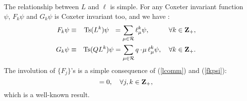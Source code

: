 \documentclass[a4paper,12pt]{article}
\begin{document}
The relationship between $L$ and $\ell$ is simple.
For any Coxeter invariant function $\psi$, $F_k\psi$
and $G_k\psi$ is Coxeter invariant too, and
we have \cite{kps}:
\begin{eqnarray}
 F_k\psi&\equiv& \mbox{Ts}(L^k)\psi\ \
=\sum_{\mu\in{\mathcal R}} \ell_\mu^k\psi,
 \ \ \,\qquad \forall k\in{\bf Z}_+,
\label{fkpsi}\\
 G_k\psi&\equiv& \mbox{Ts}(QL^k)\psi
=\sum_{\mu\in{\mathcal R}} q\cdot\!\mu\,\ell_\mu^k\psi,
 \quad \forall k\in{\bf Z}_+.
\label{gkpsi}
\end{eqnarray}
The involution of $\{F_j\}$'s  is a simple consequence of
(\ref{lcomm}) and (\ref{fkpsi}):
\begin{equation}
[F_j,F_k]=0,\quad \forall j,k\in {\bf Z}_+,
\label{fjk}
\end{equation}
which is a well-known result.
\end{document}
